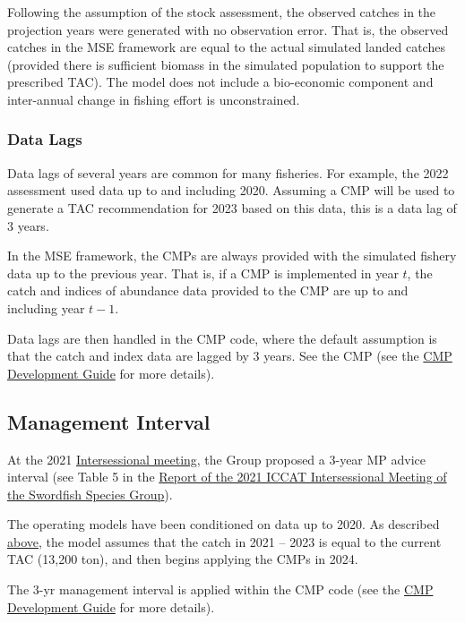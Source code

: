 \documentclass[
]{article}
\begin{document}
Following the assumption of the stock assessment, the observed catches in the projection years were generated with no observation error. That is, the observed catches in the MSE framework are equal to the actual simulated landed catches (provided there is sufficient biomass in the simulated population to support the prescribed TAC). The model does not include a bio-economic component and inter-annual change in fishing effort is unconstrained.

\hypertarget{data-lags}{%
\subsubsection{Data Lags}\label{data-lags}}

Data lags of several years are common for many fisheries. For example, the 2022 assessment used data up to and including 2020. Assuming a CMP will be used to generate a TAC recommendation for 2023 based on this data, this is a data lag of 3 years.

In the MSE framework, the CMPs are always provided with the simulated fishery data up to the previous year. That is, if a CMP is implemented in year \(t\), the catch and indices of abundance data provided to the CMP are up to and including year \(t-1\).

Data lags are then handled in the CMP code, where the default assumption is that the catch and index data are lagged by 3 years. See the CMP (see the \href{../cMPdevelopment/CMP-Development-Guide.html}{CMP Development Guide} for more details).

\hypertarget{management-interval}{%
\subsection{Management Interval}\label{management-interval}}

At the 2021 \href{/Meeting_Reports/2021_SWO_ENG.pdf}{Intersessional meeting}, the Group proposed a 3-year MP advice interval (see Table 5 in the \href{../Meeting_Reports//2021_SWO_ENG.pdf}{Report of the 2021 ICCAT Intersessional Meeting of the Swordfish Species Group}).

The operating models have been conditioned on data up to 2020. As described \protect\hyperlink{future-catches}{above}, the model assumes that the catch in 2021 -- 2023 is equal to the current TAC (13,200 ton), and then begins applying the CMPs in 2024.

The 3-yr management interval is applied within the CMP code (see the \href{../cMPdevelopment/CMP-Development-Guide.html}{CMP Development Guide} for more details).
\end{document}
